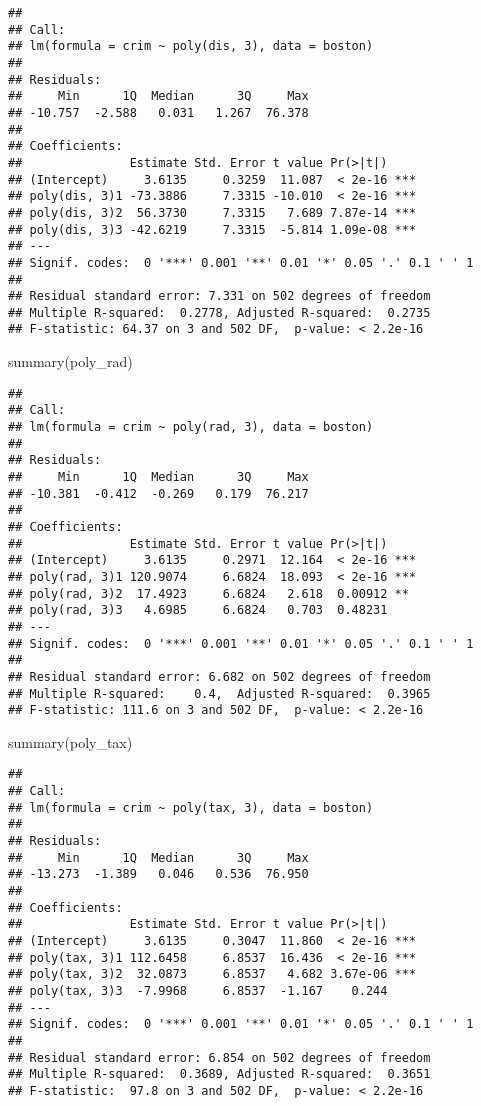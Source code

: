 \documentclass[
]{article}
\newenvironment{Shaded}{\begin{snugshade}}{\end{snugshade}}
\newcommand{\FunctionTok}[1]{\textcolor[rgb]{0.00,0.00,0.00}{#1}}
\newcommand{\NormalTok}[1]{#1}
\begin{document}
\begin{verbatim}
## 
## Call:
## lm(formula = crim ~ poly(dis, 3), data = boston)
## 
## Residuals:
##     Min      1Q  Median      3Q     Max 
## -10.757  -2.588   0.031   1.267  76.378 
## 
## Coefficients:
##               Estimate Std. Error t value Pr(>|t|)    
## (Intercept)     3.6135     0.3259  11.087  < 2e-16 ***
## poly(dis, 3)1 -73.3886     7.3315 -10.010  < 2e-16 ***
## poly(dis, 3)2  56.3730     7.3315   7.689 7.87e-14 ***
## poly(dis, 3)3 -42.6219     7.3315  -5.814 1.09e-08 ***
## ---
## Signif. codes:  0 '***' 0.001 '**' 0.01 '*' 0.05 '.' 0.1 ' ' 1
## 
## Residual standard error: 7.331 on 502 degrees of freedom
## Multiple R-squared:  0.2778, Adjusted R-squared:  0.2735 
## F-statistic: 64.37 on 3 and 502 DF,  p-value: < 2.2e-16
\end{verbatim}

\begin{Shaded}
\begin{Highlighting}[]
\FunctionTok{summary}\NormalTok{(poly\_rad)}
\end{Highlighting}
\end{Shaded}

\begin{verbatim}
## 
## Call:
## lm(formula = crim ~ poly(rad, 3), data = boston)
## 
## Residuals:
##     Min      1Q  Median      3Q     Max 
## -10.381  -0.412  -0.269   0.179  76.217 
## 
## Coefficients:
##               Estimate Std. Error t value Pr(>|t|)    
## (Intercept)     3.6135     0.2971  12.164  < 2e-16 ***
## poly(rad, 3)1 120.9074     6.6824  18.093  < 2e-16 ***
## poly(rad, 3)2  17.4923     6.6824   2.618  0.00912 ** 
## poly(rad, 3)3   4.6985     6.6824   0.703  0.48231    
## ---
## Signif. codes:  0 '***' 0.001 '**' 0.01 '*' 0.05 '.' 0.1 ' ' 1
## 
## Residual standard error: 6.682 on 502 degrees of freedom
## Multiple R-squared:    0.4,  Adjusted R-squared:  0.3965 
## F-statistic: 111.6 on 3 and 502 DF,  p-value: < 2.2e-16
\end{verbatim}

\begin{Shaded}
\begin{Highlighting}[]
\FunctionTok{summary}\NormalTok{(poly\_tax)}
\end{Highlighting}
\end{Shaded}

\begin{verbatim}
## 
## Call:
## lm(formula = crim ~ poly(tax, 3), data = boston)
## 
## Residuals:
##     Min      1Q  Median      3Q     Max 
## -13.273  -1.389   0.046   0.536  76.950 
## 
## Coefficients:
##               Estimate Std. Error t value Pr(>|t|)    
## (Intercept)     3.6135     0.3047  11.860  < 2e-16 ***
## poly(tax, 3)1 112.6458     6.8537  16.436  < 2e-16 ***
## poly(tax, 3)2  32.0873     6.8537   4.682 3.67e-06 ***
## poly(tax, 3)3  -7.9968     6.8537  -1.167    0.244    
## ---
## Signif. codes:  0 '***' 0.001 '**' 0.01 '*' 0.05 '.' 0.1 ' ' 1
## 
## Residual standard error: 6.854 on 502 degrees of freedom
## Multiple R-squared:  0.3689, Adjusted R-squared:  0.3651 
## F-statistic:  97.8 on 3 and 502 DF,  p-value: < 2.2e-16
\end{verbatim}
\end{document}
